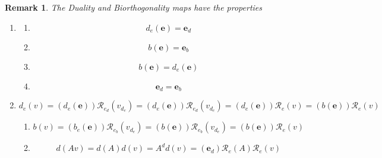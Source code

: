 \documentclass[aps,preprint]{revtex4}
\newtheorem{remark}[theorem]{Remark}
\begin{document}
\begin{remark}
The Duality and Biorthogonality maps have the properties

\begin{enumerate}
\item 
\begin{enumerate}
\item 
\begin{equation}
d_{e}\left( \boldsymbol{e}\right) =\boldsymbol{e}_{d}
\end{equation}

\item 
\begin{equation}
b\left( \boldsymbol{e}\right) =\boldsymbol{e}_{b}
\end{equation}

\item 
\begin{equation}
b\left( \boldsymbol{e}\right) =d_{e}\left( \boldsymbol{e}\right)
\end{equation}

\item 
\begin{equation}
\boldsymbol{e}_{d}=\boldsymbol{e}_{b}
\end{equation}
\end{enumerate}

\item 
\begin{equation}
d_{e}\left( v\right) =\left( d_{e}\left( \boldsymbol{e}\right) \right) 
\mathcal{R}_{e_{d}}\left( v_{d_{e}}\right) =\left( d_{e}\left( \boldsymbol{e}%
\right) \right) \mathcal{R}_{e_{d}}\left( v_{d_{e}}\right) =\left(
d_{e}\left( \boldsymbol{e}\right) \right) \mathcal{R}_{e}\left( v\right)
=\left( b\left( \boldsymbol{e}\right) \right) \mathcal{R}_{e}\left( v\right)
\end{equation}

\begin{enumerate}
\item 
\begin{equation}
b\left( v\right) =\left( b_{e}\left( \boldsymbol{e}\right) \right) \mathcal{R%
}_{e_{b}}\left( v_{d_{e}}\right) =\left( b\left( \boldsymbol{e}\right)
\right) \mathcal{R}_{e_{b}}\left( v_{d_{e}}\right) =\left( b\left( 
\boldsymbol{e}\right) \right) \mathcal{R}_{e}\left( v\right)
\end{equation}

\item 
\begin{equation}
d\left( Av\right) =d\left( A\right) d\left( v\right) =A^{d}d\left( v\right)
=\left( \boldsymbol{e}_{d}\right) \mathcal{R}_{e}\left( A\right) \mathcal{R}%
_{e}\left( v\right)
\end{equation}


\end{enumerate}
\end{enumerate}
\end{remark}
\end{document}
